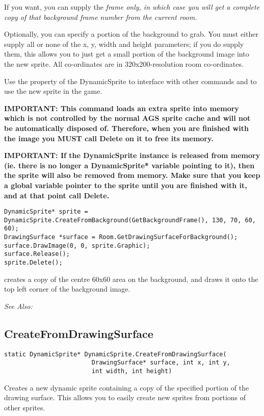 If you want, you can supply the \it{frame} only, in which case you will get a
complete copy of that background frame number from the current room.

Optionally, you can specify a portion of the background to grab. You must
either supply all or none of the x, y, width and height parameters; if you
do supply them, this allows you to just get a small portion of the background
image into the new sprite. All co-ordinates are in 320x200-resolution room co-ordinates.

Use the  property of the DynamicSprite to
interface with other commands and to use the new sprite in the game.

\bf{IMPORTANT:} This command loads an extra sprite into memory which is not controlled
by the normal AGS sprite cache and will not be automatically disposed of. Therefore, when
you are finished with the image you \bf{MUST} call Delete on it to free its memory.

\bf{IMPORTANT:} If the DynamicSprite instance is released from memory (ie. there is
no longer a DynamicSprite* variable pointing to it), then the sprite will also be
removed from memory. Make sure that you keep a global variable pointer to the sprite
until you are finished with it, and at that point call Delete.

\begin{verbatim}
DynamicSprite* sprite = DynamicSprite.CreateFromBackground(GetBackgroundFrame(), 130, 70, 60, 60);
DrawingSurface *surface = Room.GetDrawingSurfaceForBackground();
surface.DrawImage(0, 0, sprite.Graphic);
surface.Release();
sprite.Delete();
\end{verbatim}
creates a copy of the centre 60x60 area on the background, and draws it onto the
top left corner of the background image.

\it{See Also:} 


\subsection{CreateFromDrawingSurface}\label{DynamicSprite.CreateFromDrawingSurface}%

\begin{verbatim}
static DynamicSprite* DynamicSprite.CreateFromDrawingSurface(
                        DrawingSurface* surface, int x, int y,
                        int width, int height)
\end{verbatim}
Creates a new dynamic sprite containing a copy of the specified portion of
the drawing surface. This allows you to easily create new sprites from portions
of other sprites.


